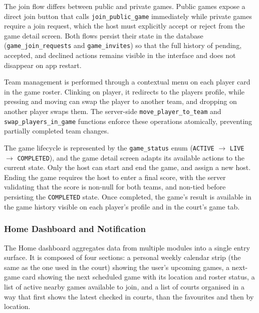 The join flow differs between public and private games.
Public games expose a direct join button that calls \texttt{join\_public\_game} immediately while private games require a join request, which the host must explicitly accept or reject from the game detail screen.
Both flows persist their state in the database (\texttt{game\_join\_requests} and \texttt{game\_invites}) so that the full history of pending, accepted, and declined actions remains visible in the interface and does not disappear on app restart.

Team management is performed through a contextual menu on each player card in the game roster.
Clinking on player, it redirects to the players profile, while pressing and moving can swap the player to another team, and dropping on another player swaps them.
The server-side \texttt{move\_player\_to\_team} and \texttt{swap\_players\_in\_game} functions enforce these operations atomically, preventing partially completed team changes.

The game lifecycle is represented by the \texttt{game\_status} enum (\texttt{ACTIVE} $\rightarrow$ \texttt{LIVE} $\rightarrow$ \texttt{COMPLETED}), and the game detail screen adapts its available actions to the current state.
Only the host can start and end the game, and assign a new host.
Ending the game requires the host to enter a final score, with the server validating that the score is non-null for both teams, and non-tied before persisting the \texttt{COMPLETED} state.
Once completed, the game's result is available in the game history visible on each player's profile and in the court's game tab.

\subsubsection{Home Dashboard and Notification}

The Home dashboard aggregates data from multiple modules into a single entry surface.
It is composed of four sections: a personal weekly calendar strip (the same as the one used in the court) showing the user's upcoming games, a next-game card showing the next scheduled game with its location and roster status, a list of active nearby games available to join,  and a list of courts organised in a way that first shows the latest checked in courts, than the favourites and then by location.

